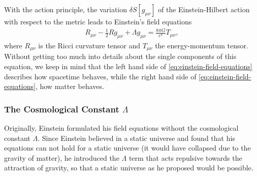 \noindent With the action principle, the variation $\delta S[g_{\mu\nu}]$ of the Einstein-Hilbert action with respect to the metric leads to Einstein's field equations
\begin{align}
    R_{\mu\nu} - \frac{1}{2}R g_{\mu\nu} + \Lambda g_{\mu\nu} = \frac{8\pi G}{c^4}T_{\mu \nu}, \label{eq:einstein-field-equations}
\end{align}
where $R_{\mu\nu}$ is the Ricci curvature tensor and $T_{\mu\nu}$ the energy-momentum tensor. \\
\noindent Without getting too much into details about the single components of this equation, we keep in mind that the left hand side of \eqref{eq:einstein-field-equations} describes how spacetime behaves, while the right hand side of \eqref{eq:einstein-field-equations}, how matter behaves.

\subsubsection{The Cosmological Constant $\Lambda$}

\noindent Originally, Einstein formulated his field equations without the cosmological constant $\Lambda$. Since Einstein believed in a static universe and found that his equations can not hold for a static universe (it would have collapsed due to the gravity of matter), he introduced the $\Lambda$ term that acts repulsive towards the attraction of gravity, so that a static universe as he proposed would be possible. \\

